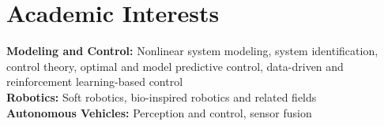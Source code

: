 \section{Academic Interests}
\textbf{Modeling and Control:} Nonlinear system modeling, system identification, control theory, optimal and model predictive control, data-driven and reinforcement learning-based control \\
\textbf{Robotics:} Soft robotics, bio-inspired robotics and related fields \\
\textbf{Autonomous Vehicles:} Perception and control, sensor fusion
